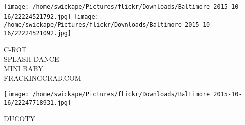 \documentclass[10pt,letterpaper]{article}
\begin{document}
\texttt{[image: /home/swickape/Pictures/flickr/Downloads/Baltimore 2015-10-16/22224521792.jpg]}
\texttt{[image: /home/swickape/Pictures/flickr/Downloads/Baltimore 2015-10-16/22224521092.jpg]}

C{-}ROT\\
SPLASH DANCE\\
MINI BABY\\
FRACKINGCRAB.COM\\
\pagebreak

\texttt{[image: /home/swickape/Pictures/flickr/Downloads/Baltimore 2015-10-16/22247718931.jpg]}

DUCOTY\\
\pagebreak
\end{document}
